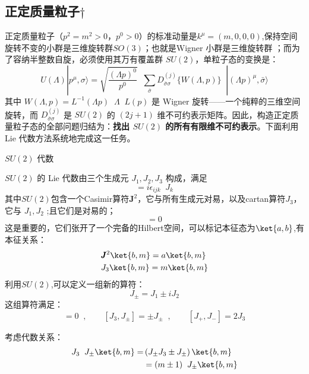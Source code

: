 \subsection{正定质量粒子\(\dagger\)}
正定质量粒子（$p^2 = m^2 > 0$，$p^0 > 0$）的标准动量是$k
^\mu=(m,0,0,0)$,保持空间旋转不变的小群是三维旋转群$SO(3)$；也就是Wigner 小群是三维旋转群 ；而为了容纳半整数自旋，必须使用其万有覆盖群 $SU(2)$，单粒子态的变换是：
\begin{equation}
U(\Lambda)|p^\mu,\sigma\rangle
= \sqrt{\frac{(\Lambda p)^0}{p^0}}\;\;
\sum_{\bar{\sigma}} D^{(j)}_{\bar{\sigma}\sigma}\{W(\Lambda,p)\}\;\;
|(\Lambda p)^\mu,\bar{\sigma}\rangle
\end{equation}
其中 $W(\Lambda,p) = L^{-1}(\Lambda p)\;\;\Lambda\;\;L(p)$ 是 Wigner 旋转——一个纯粹的三维空间旋转，而 $D^{(j)}_{\bar{\sigma}\sigma}$ 是 $SU(2)$ 的 $(2j+1)$ 维不可约表示矩阵。因此，构造正定质量粒子态的全部问题归结为：\textbf{找出 $SU(2)$ 的所有有限维不可约表示}。下面利用 Lie 代数方法系统地完成这一任务。
\begin{center}\vspace{2ex}
\large$SU(2)$ 代数
\vspace{2ex}\end{center}
$SU(2)$ 的 Lie 代数由三个生成元 $J_1, J_2, J_3$ 构成，满足
\begin{equation}
[J_i, J_j] = i\epsilon_{ijk}\;\;J_k
\end{equation}
其中$SU(2)$包含一个Casimir算符$\pmb{J}^2$，它与所有生成元对易，以及cartan算符$J_3$，它与 $J_1, J_2$ ;且它们是对易的；
\begin{equation}
    [\pmb{J}^2,J_3]=0
\end{equation}
这是重要的，它们张开了一个完备的Hilbert空间，可以标记本征态为$\ket{a,b}$,有本征关系：
\begin{subequations}
    \begin{align}
        &\pmb{J}^2\ket{b,m}=a\ket{b,m}\\
        &J_3\ket{b,m}=m\ket{b,m}
    \end{align}
\end{subequations}
利用$SU(2)$,可以定义一组新的算符：
\begin{equation}
J_{\pm} = J_1 \pm iJ_2
\end{equation}
这组算符满足：
\begin{equation}
[\pmb{J}^2, J_{\pm}]=0\;\;,\qquad
[J_3, J_{\pm}] = \pm J_{\pm}\;\;,\qquad
[J_+, J_-] = 2J_3
\end{equation}
\par
考虑代数关系：
\begin{equation}
    \begin{aligned}
        J_3\;\;J_\pm\ket{b,m}=&\left(J_\pm J_3\pm J_\pm\right)\ket{b,m}\\
        &= (m \pm 1)\;\;J_\pm\ket{b,m}
    \end{aligned}
\end{equation}
